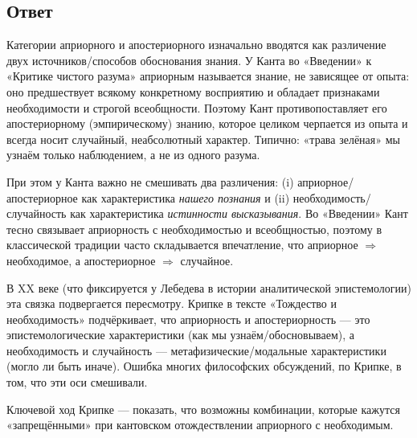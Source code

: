 \documentclass[a4paper,12pt]{article}
\begin{document}
\subsection{Ответ}

Категории априорного и апостериорного изначально вводятся как различение двух источников/способов обоснования знания. У Канта во «Введении» к «Критике чистого разума» априорным называется знание, не зависящее от опыта: оно предшествует всякому конкретному восприятию и обладает признаками необходимости и строгой всеобщности. Поэтому Кант противопоставляет его апостериорному (эмпирическому) знанию, которое целиком черпается из опыта и всегда носит случайный, неабсолютный характер. Типично: «трава зелёная» мы узнаём только наблюдением, а не из одного разума.

При этом у Канта важно не смешивать два различения: (i) априорное/апостериорное как характеристика \emph{нашего познания} и (ii) необходимость/случайность как характеристика \emph{истинности высказывания}. Во «Введении» Кант тесно связывает априорность с необходимостью и всеобщностью, поэтому в классической традиции часто складывается впечатление, что априорное $\Rightarrow$ необходимое, а апостериорное $\Rightarrow$ случайное.

В XX веке (что фиксируется у Лебедева в истории аналитической эпистемологии) эта связка подвергается пересмотру. Крипке в тексте «Тождество и необходимость» подчёркивает, что априорность и апостериорность --- это эпистемологические характеристики (как мы узнаём/обосновываем), а необходимость и случайность --- метафизические/модальные характеристики (могло ли быть иначе). Ошибка многих философских обсуждений, по Крипке, в том, что эти оси смешивали.

Ключевой ход Крипке --- показать, что возможны комбинации, которые кажутся «запрещёнными» при кантовском отождествлении априорного с необходимым.
\end{document}
